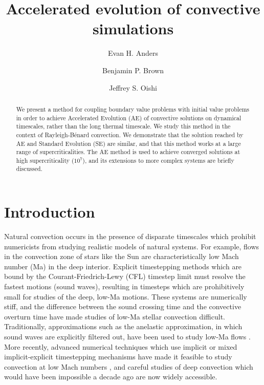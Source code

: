 \documentclass[aps, pre, onecolumn, nofootinbib, notitlepage, groupedaddress, amsfonts, amssymb, amsmath, longbibliography]{revtex4-1}
\newcommand{\RB}{Rayleigh-B\'{e}nard }
\begin{document}
\author{Evan H. Anders}
\author{Benjamin P. Brown}
\author{Jeffrey S. Oishi}
\title{Accelerated evolution of convective simulations}

\begin{abstract}
We present a method for coupling boundary value problems with initial value problems 
in order to achieve Accelerated Evolution (AE) of convective solutions on
dynamical timescales, rather than the long thermal timescale. 
We study this method in the context of \RB convection. 
We demonstrate that the solution reached by AE and Standard Evolution (SE) are
similar, and that this method works at a
large range of supercriticalities.  The AE method is used to achieve converged 
solutions at high supercriticality ($10^7$), and its extensions to more complex 
systems are briefly discussed.
\end{abstract}
\maketitle


\section{Introduction}
\label{sec:intro}
Natural convection occurs in the presence of disparate timescales which
prohibit numericists from studying realistic models of natural systems.  For example,
flows in the convection zone of stars like the Sun are characteristically low Mach number
(Ma) in the deep interior.
Explicit timestepping methods which are bound by the Courant-Friedrich-Lewy
(CFL) timestep limit must resolve the fastest motions (sound
waves), resulting in timesteps which are prohibitively
small for studies of the deep, low-Ma motions. These systems are numerically
stiff, and the difference between
the sound crossing time and the convective overturn time have made studies of low-Ma stellar
convection difficult. Traditionally, approximations such as
the anelastic approximation, in which sound waves are explicitly filtered out,
have been used to study low-Ma flows \cite{brown&all2010, featherstone&hindman2016}.
More recently, advanced numerical techniques which use implicit or mixed
implicit-explicit timestepping mechanisms have made it feasible to study
convection at low Mach numbers \cite{viallet&all2011, viallet&all2013, viallet&all2016, lecoanet&all2014,
anders&brown2017, bordwell&all2018}, and careful studies of deep convection which
would have been impossible a decade ago are now widely accessible.
\end{document}
